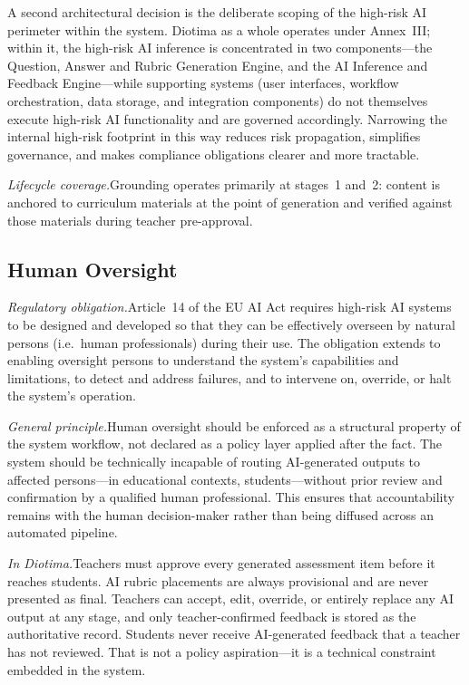 \documentclass[10pt, a4paper, twocolumn]{article}
\begin{document}
A second architectural decision is the deliberate scoping of the high-risk AI
perimeter within the system. Diotima as a whole operates under Annex~III; within
it, the high-risk AI inference is concentrated in two components---the Question,
Answer and Rubric Generation Engine, and the AI Inference and Feedback Engine---while
supporting systems (user interfaces, workflow orchestration, data storage, and
integration components) do not themselves execute high-risk AI functionality and
are governed accordingly. Narrowing the internal high-risk footprint in this way
reduces risk propagation, simplifies governance, and makes compliance obligations
clearer and more tractable.

\textit{Lifecycle coverage.}\quad Grounding operates primarily at stages~1 and~2:
content is anchored to curriculum materials at the point of generation and verified
against those materials during teacher pre-approval.

\subsection{Human Oversight}

\textit{Regulatory obligation.}\quad Article~14 of the EU AI Act requires high-risk AI
systems to be designed and developed so that they can be effectively overseen by natural
persons (i.e.\ human professionals) during their use. The obligation extends to enabling oversight persons to
understand the system's capabilities and limitations, to detect and address failures,
and to intervene on, override, or halt the system's operation.

\textit{General principle.}\quad Human oversight should be enforced as a structural
property of the system workflow, not declared as a policy layer applied after the fact.
The system should be technically incapable of routing AI-generated outputs to affected
persons---in educational contexts, students---without prior review and confirmation by
a qualified human professional. This ensures that accountability remains with the human
decision-maker rather than being diffused across an automated pipeline.

\textit{In Diotima.}\quad Teachers must approve every generated assessment item
before it reaches students. AI rubric placements are always provisional and are never
presented as final. Teachers can accept, edit, override, or entirely replace any AI
output at any stage, and only teacher-confirmed feedback is stored as the authoritative
record. Students never receive AI-generated feedback that a teacher has not reviewed.
That is not a policy aspiration---it is a technical constraint embedded in the system.
\end{document}
